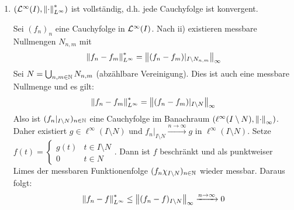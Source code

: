 \begin{beispiel*}
\begin{enumerate}
\begin{beweis}
\end{beweis}
\item $ (\mathcal L^\infty(I),\left\|\cdot\right\|^\ast_{L^\infty}) $ ist vollst\"andig, d.h. jede Cauchyfolge ist konvergent.
\begin{beweis}
Sei $ (f_n)_n $ eine Cauchyfolge in $ \mathcal L^\infty(I) $. Nach ii) existieren messbare Nullmengen $ N_{n,m} $ mit
\[ \left\|f_n-f_m\right\|_{L^\infty}^\ast=\left\|(f_n-f_m)|_{I\setminus N_{n,m}}\right\|_\infty \]
Sei $ N=\bigcup_{n,m\in\mathbb{N}} N_{n,m} $ (abz\"ahlbare Vereinigung). Dies ist auch eine messbare Nullmenge und es gilt:
\[ \left\|f_n-f_m\right\|^\ast_{L^\infty}=\left\|(f_n-f_m)|_{I\setminus N}\right\|_\infty \]
Also ist $ (f_n|_{I\setminus N})_{n\in\mathbb{N}} $ eine Cauchyfolge im Banachraum $ (\ell^\infty(I\setminus N),\left\|\cdot\right\|_\infty) $. Daher existiert $ g\in\ell^\infty(I\setminus N) $ und $ f_n|_{I\setminus N}\xrightarrow{n\to\infty}g $ in $ \ell^\infty(I\setminus N) $. Setze $ f(t)= \begin{cases}
g(t)&t\in I\setminus N\\0&t\in N
\end{cases} $. Dann ist $ f $ beschr\"ankt und als punktweiser Limes der messbaren Funktionenfolge $ (f_n\chi_{I\setminus N})_{n\in\mathbb{N}} $ wieder messbar. Daraus folgt:
\[ \left\|f_n-f\right\|^\ast_{L^\infty}\leq\left\|(f_n-f)_{I\setminus N}\right\|_\infty\xrightarrow{n\to\infty}0 \]
\end{beweis}
\end{enumerate}
\end{beispiel*}
